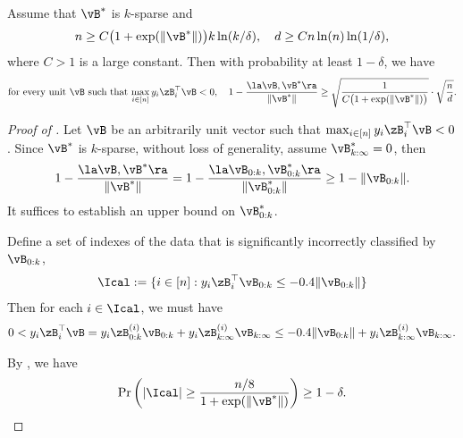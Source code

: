 \documentclass[11pt]{article}
\begin{document}
\begin{lemma}\label{lemma:zero-one:angle-lower-bound}
Assume that $\vB^*$ is $k$-sparse and 
\begin{align*}
    n \ge C \big( 1+\exp(\|\vB^*\|)\big)  k  \ln(k /\delta),\quad 
    d\ge C n\ln(n)\ln(1/\delta),
\end{align*} 
where $C>1$ is a large constant. 
Then with probability at least $1-\delta$, we have 
\begin{align*}
    \text{for every unit $\vB$ such that $\max_{i\in[n]} y_i\zB_i^\top \vB< 0$},\quad 1 -\frac{\la \vB,\vB^*\ra }{\|\vB^*\|} \ge \sqrt{ \frac{1}{C\big( 1+\exp(\|\vB^*\|) \big) }} \cdot \sqrt{\frac{n}{d}}.
\end{align*}
\end{lemma}
\begin{proof}[Proof of ]




Let $\vB$ be an arbitrarily unit vector such that $\max_{i\in[n]} y_i\zB_i^\top \vB < 0$.
Since $\vB^*$ is $k$-sparse, without loss of generality, assume $\vB^*_{k:\infty} = 0$, then
\begin{align*}
    1- \frac{\la \vB, \vB^*\ra }{\|\vB^*\|}
    = 1- \frac{\la \vB_{0:k}, \vB^*_{0:k}\ra }{\|\vB^*_{0:k}\|} 
    \ge  1- \|\vB_{0:k}\|.
\end{align*}
It suffices to establish an upper bound on $\vB^*_{0:k}$.

Define a set of indexes of the data that is significantly incorrectly classified by $\vB_{0:k}$,
\begin{align*}
    \Ical:= \{i\in[n]: y_i\zB_i^\top \vB_{0:k} \le - 0.4 \|\vB_{0:k}\| \}
\end{align*}
Then for each $i\in\Ical$, we must have 
\begin{align*}
    0< y_i\zB_i^\top \vB = y_i \zB^{(i)}_{0:k} \vB_{0:k} + y_i \zB^{(i)}_{k:\infty} \vB_{k:\infty} \le  - 0.4 \|\vB_{0:k}\| + y_i \zB^{(i)}_{k:\infty} \vB_{k:\infty}.
\end{align*}

By , we have 
\begin{align*}
\Pr \bigg( |\Ical| \ge     \frac{n/8}{1+\exp(\|\vB^*\|)} \bigg) \ge 1-\delta.
\end{align*}


\end{proof}
\end{document}
